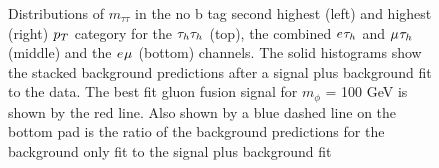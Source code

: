 \begin{figure}[!hbtp]
\caption{Distributions of $m_{\tau\tau}$ in the no b tag second highest (left) and highest (right) $p_{T}$ category for the $\tau_{h}\tau_{h}$ (top), the combined $e_{}\tau_{h}$ and $\mu_{}\tau_{h}$ (middle) and the $e_{}\mu_{}$ (bottom) channels. The solid histograms show the stacked background predictions after a signal plus background fit to the data. The best fit gluon fusion signal for $m_{\phi}$ = 100 GeV is shown by the red line. Also shown by a blue dashed line on the bottom pad is the ratio of the background predictions for the background only fit to the signal plus background fit }
\label{fig:low_mass_postfit}
\end{figure}

